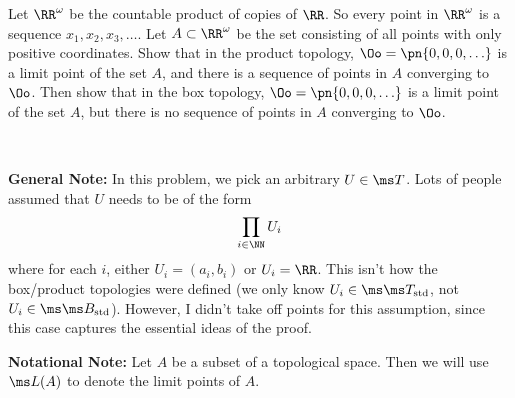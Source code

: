 \documentclass{fkpset}
\newcommand{\tstd}{\ensuremath \ms T_{\rm std}}
\newcommand{\bstd}{\ensuremath \ms B_{\rm std}}
\newenvironment{why}{\begin{adjustwidth}{0.01\linewidth}{0.05\linewidth}~}%
  {\end{adjustwidth}}
\begin{document}
  \begin{problem}[4.41]
    Let $\RR^\omega$ be the countable product of copies of $\RR$. So
    every point in $\RR^\omega$ is a sequence $x_1, x_2, x_3, \ldots$.
    Let $A \subset \RR^\omega$ be the set consisting of all points
    with only positive coordinates. Show that in the product topology,
    $\Oo = \pn{0,0,0,\ldots}$ is a limit point of the set $A$, and
    there is a sequence of points in $A$ converging to $\Oo$. Then
    show that in the box topology, $\Oo = \pn{0,0,0,\ldots}$ is a
    limit point of the set $A$, but there is no sequence of points in
    $A$ converging to $\Oo$.
  \end{problem}
  \begin{why}
    \begin{leftbar}
      \textbf{General Note:} In this problem, we pick an arbitrary $U
      \in \ms T$. Lots of people assumed that $U$ needs to be of the
      form
      \[
        \prod_{i \in \NN} U_i
      \]
      where for each $i$, either $U_i = (a_i, b_i)$ or $U_i = \RR$.
      This isn't how the box/product topologies were defined (we only
      know $U_i \in \ms \tstd$, not $U_i \in \ms \bstd$). However, I
      didn't take off points for this assumption, since this case
      captures the essential ideas of the proof.
    \end{leftbar}
    \begin{leftbar}
      \textbf{Notational Note:} Let $A$ be a subset of a topological
      space. Then we will use $\ms L(A)$ to denote the limit points of
      $A$.
    \end{leftbar}
  \end{why}
\end{document}
